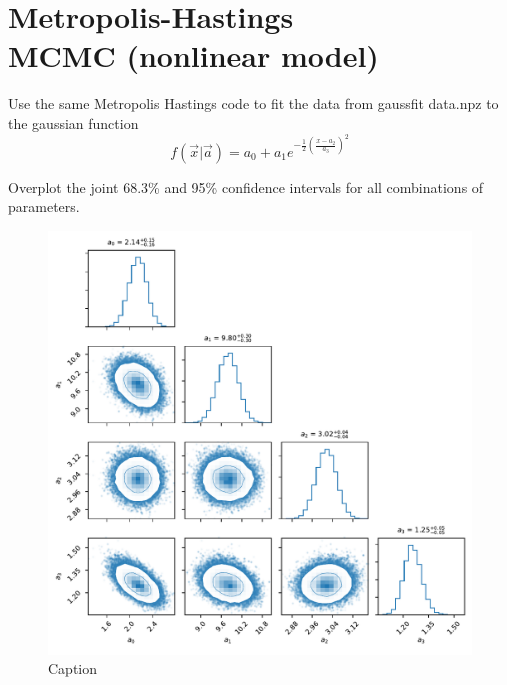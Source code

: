 \section{Metropolis-Hastings \\MCMC (nonlinear model)}

Use the same Metropolis Hastings code to fit the data from gaussfit data.npz to the gaussian function
\begin{equation}
    f(\Vec{x}|\Vec{a})=a_0+a_1e^{-\frac{1}{2}(\frac{x-a_2}{a_3})^2}
\end{equation}

Overplot the joint 68.3\% and 95\% confidence intervals for all combinations of parameters.

\begin{figure}
    \centering
    \includegraphics{CodeAndFigures/GaussianModelMetropolisHastings.pdf}
    \caption{Caption}
    \label{fig:GaussHastings}
\end{figure}